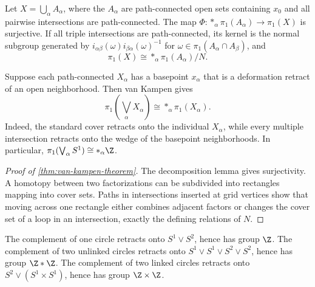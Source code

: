 \begin{theorem}
\label{thm:van-kampen-theorem}
Let $X=\bigcup_\alpha A_\alpha$, where the $A_\alpha$ are path-connected open
sets containing $x_0$ and all pairwise intersections are path-connected. The
map $\Phi:*_\alpha\pi_1(A_\alpha)\to\pi_1(X)$ is surjective. If all triple
intersections are path-connected, its kernel is the normal subgroup generated
by $i_{\alpha\beta}(\omega)i_{\beta\alpha}(\omega)^{-1}$ for
$\omega\in\pi_1(A_\alpha\cap A_\beta)$, and
\[
\pi_1(X)\cong *_\alpha\pi_1(A_\alpha)/N.
\]
\end{theorem}

\begin{example}
\label{ex:wedge-sum-fundamental-group}
Suppose each path-connected $X_\alpha$ has a basepoint $x_\alpha$ that is a
deformation retract of an open neighborhood. Then van Kampen gives
\[
\pi_1\left(\bigvee_\alpha X_\alpha\right)\cong *_\alpha\pi_1(X_\alpha).
\]
Indeed, the standard cover retracts onto the individual $X_\alpha$, while every
multiple intersection retracts onto the wedge of the basepoint neighborhoods.
In particular, $\pi_1(\bigvee_\alpha S^1)\cong *_\alpha\Z$.
\end{example}

\begin{proof}[Proof of \cref{thm:van-kampen-theorem}]
\sketch The decomposition lemma gives surjectivity. A homotopy between two
factorizations can be subdivided into rectangles mapping into cover sets.
Paths in intersections inserted at grid vertices show that moving across one
rectangle either combines adjacent factors or changes the cover set of a loop
in an intersection, exactly the defining relations of $N$.
\end{proof}

\begin{example}
\label{ex:linking-of-circles-fundamental-groups}
The complement of one circle retracts onto $S^1\vee S^2$, hence has group
$\Z$. The complement of two unlinked circles retracts onto
$S^1\vee S^1\vee S^2\vee S^2$, hence has group $\Z*\Z$. The complement of
two linked circles retracts onto $S^2\vee(S^1\times S^1)$, hence has group
$\Z\times\Z$.
\end{example}

